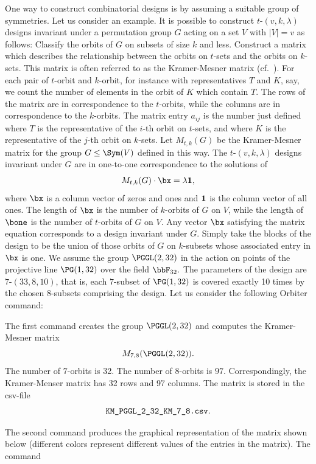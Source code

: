 One way to construct combinatorial designs is by assuming a suitable group of symmetries. 
Let us consider an example. 
It is possible to construct $t$-$(v,k,\lambda)$ 
designs invariant under a permutation group $G$ 
acting on a set $V$ with $|V| = v$ as follows: 
Classify the orbits of $G$ on subsets of size $k$ and less. 
Construct a matrix which describes the relationship between 
the orbits on $t$-sets and the orbits on $k$-sets. 
This matrix is often referred to as the Kramer-Mesner matrix (cf.~\cite{KramerMesner76}).
For each pair of $t$-orbit and $k$-orbit, 
for instance with representatives $T$ and $K$, say, 
we count the number of elements in the orbit of $K$ which contain $T$. 
The rows of the matrix are in correspondence to the $t$-orbits, 
while the columns are in correspondence to the $k$-orbits. 
The matrix entry $a_{ij}$ is the number just defined where $T$ is the representative of the 
$i$-th orbit on $t$-sets, 
and where $K$ is the representative of the $j$-th orbit on $k$-sets. 
Let $M_{t,k}(G)$ be the Kramer-Mesner matrix 
for the group $G \le \Sym(V)$ defined in this way. 
The 
$t$-$(v,k,\lambda)$ designs invariant under $G$ 
are in one-to-one correspondence to the solutions of 
$$
M_{t,k}(G)\cdot \bx = \lambda {\bf 1},
$$
where $\bx$ is a column vector of zeros and ones 
and ${\bf 1}$ is the column vector of all ones.
The length of $\bx$ is the number of $k$-orbits of $G$ on $V$, 
while the length of $\bone$ is the number of $t$-orbits of $G$ on $V$. 
Any vector $\bx$ satisfying the matrix equation 
corresponds to a design invariant under $G$.
Simply take the  blocks of the design to be the union 
of those orbits of $G$ on $k$-subsets 
whose associated entry in $\bx$ is one.
We assume the group $\PGGL(2,32)$ in the action on points 
of the projective line $\PG(1,32)$ 
over the field $\bbF_{32}.$
The parameters of the design are $7$-$(33,8,10)$, 
that is, each $7$-subset of $\PG(1,32)$
is covered exactly 10 times by the chosen $8$-subsets comprising the design.
Let us consider the following Orbiter command:


The first command creates the group $\PGGL(2,32)$ 
and computes the Kramer-Mesner matrix 
$$
M_{7,8}(\PGGL(2,32)).
$$
The number of $7$-orbits is 32. The number of $8$-orbits is $97.$
Correspondingly, the Kramer-Menser matrix has 32 rows and 97 columns.
The matrix is stored in the csv-file 
$$
\verb'KM_PGGL_2_32_KM_7_8.csv'.
$$

The second command produces the graphical representation 
of the matrix shown below
(different colors represent different values of the entries in the matrix).
The command

